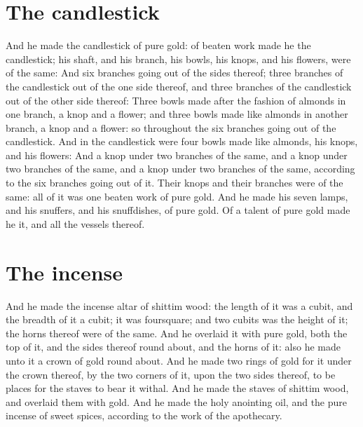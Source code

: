 \begin{biblechapter}
\section*{The candlestick}
\verse And he made the candlestick of pure gold: of beaten work made he the candlestick; his shaft, and his branch, his bowls, his knops, and his flowers, were of the same:
\verse And six branches going out of the sides thereof; three branches of the candlestick out of the one side thereof, and three branches of the candlestick out of the other side thereof:
\verse Three bowls made after the fashion of almonds in one branch, a knop and a flower; and three bowls made like almonds in another branch, a knop and a flower: so throughout the six branches going out of the candlestick.
\verse And in the candlestick were four bowls made like almonds, his knops, and his flowers:
\verse And a knop under two branches of the same, and a knop under two branches of the same, and a knop under two branches of the same, according to the six branches going out of it.
\verse Their knops and their branches were of the same: all of it was one beaten work of pure gold.
\verse And he made his seven lamps, and his snuffers, and his snuffdishes, of pure gold.
\verse Of a talent of pure gold made he it, and all the vessels thereof.
\columnbreak %
\section*{The incense}
\verse And he made the incense altar of shittim wood: the length of it was a cubit, and the breadth of it a cubit; it was foursquare; and two cubits was the height of it; the horns thereof were of the same.
\verse And he overlaid it with pure gold, both the top of it, and the sides thereof round about, and the horns of it: also he made unto it a crown of gold round about.
\verse And he made two rings of gold for it under the crown thereof, by the two corners of it, upon the two sides thereof, to be places for the staves to bear it withal.
\verse And he made the staves of shittim wood, and overlaid them with gold.
\verse And he made the holy anointing oil, and the pure incense of sweet spices, according to the work of the apothecary.
\end{biblechapter}

